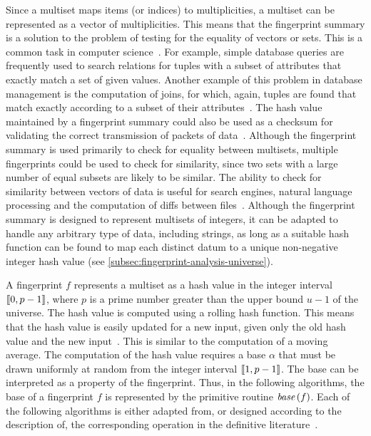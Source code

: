 Since a multiset maps items (or indices) to multiplicities, a multiset can be represented as a vector of multiplicities.
This means that the fingerprint summary is a solution to the problem of testing for the equality of vectors or sets.
This is a common task in computer science~\citep{breslauer11}.
For example, simple database queries are frequently used to search relations for tuples with a subset of attributes that exactly match a set of given values.
Another example of this problem in database management is the computation of joins, for which, again, tuples are found that match exactly according to a subset of their attributes~\citep{karp87}.
The hash value maintained by a fingerprint summary could also be used as a checksum for validating the correct transmission of packets of data~\citep{tridgell96}.
Although the fingerprint summary is used primarily to check for equality between multisets, multiple fingerprints could be used to check for similarity, since two sets with a large number of equal subsets are likely to be similar.
The ability to check for similarity between vectors of data is useful for search engines, natural language processing and the computation of diffs between files~\citep{tridgell96}.
Although the fingerprint summary is designed to represent multisets of integers, it can be adapted to handle any arbitrary type of data, including strings, as long as a suitable hash function can be found to map each distinct datum to a unique non-negative integer hash value (see \cref{subsec:fingerprint-analysis-universe}).

A fingerprint \( f \) represents a multiset as a hash value in the integer interval \( \llbracket0, p - 1\rrbracket \), where \( p \) is a prime number greater than the upper bound \( u - 1 \) of the universe.
The hash value is computed using a rolling hash function.
This means that the hash value is easily updated for a new input, given only the old hash value and the new input~\citep{karp87}.
This is similar to the computation of a moving average.
The computation of the hash value requires a base \( \alpha \) that must be drawn uniformly at random from the integer interval \( \llbracket1, p - 1\rrbracket \).
The base can be interpreted as a property of the fingerprint.
Thus, in the following algorithms, the base of a fingerprint \( f \) is represented by the primitive routine \( \base (f) \).
Each of the following algorithms is either adapted from, or designed according to the description of, the corresponding operation in the definitive literature~\citep{cormode20}.
